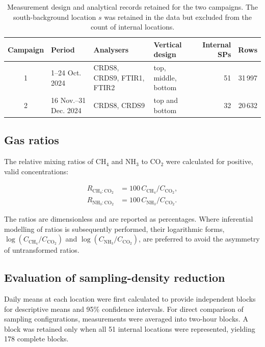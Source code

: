 \documentclass[12pt,a4paper]{article}
\begin{document}
\begin{table}[htbp]
\centering
\caption{Measurement design and analytical records retained for the two
campaigns. The south-background location \(s\) was retained in the data but
excluded from the count of internal locations.}
\label{tab:campaigns}
\begingroup
\small
\setlength{\tabcolsep}{2.2pt}
\begin{tabular}{@{}c l
  >{\raggedright\arraybackslash}p{4.0cm}
  >{\raggedright\arraybackslash}p{2.7cm}
  r r@{}}
\toprule
Campaign & Period & Analysers & Vertical design & Internal SPs & Rows\\
\midrule
1 & 1--24 Oct. 2024 & CRDS8, CRDS9, FTIR1, FTIR2 &
top, middle, bottom & 51 & 31\,997\\
2 & 16 Nov.--31 Dec. 2024 & CRDS8, CRDS9 &
top and bottom & 32 & 20\,632\\
\bottomrule
\end{tabular}
\endgroup
\end{table}

\subsection{Gas ratios}

The relative mixing ratios of \(\mathrm{CH_4}\) and \(\mathrm{NH_3}\) to
\(\mathrm{CO_2}\) were calculated for positive, valid concentrations:

\begin{align}
R_{\mathrm{CH_4:CO_2}} &=
100\,C_{\mathrm{CH_4}}/C_{\mathrm{CO_2}},\\
R_{\mathrm{NH_3:CO_2}} &=
100\,C_{\mathrm{NH_3}}/C_{\mathrm{CO_2}}.
\end{align}

The ratios are dimensionless and are reported as percentages. Where
inferential modelling of ratios is subsequently performed, their logarithmic
forms, \(\log(C_{\mathrm{CH_4}}/C_{\mathrm{CO_2}})\) and
\(\log(C_{\mathrm{NH_3}}/C_{\mathrm{CO_2}})\), are preferred to avoid the
asymmetry of untransformed ratios.

\subsection{Evaluation of sampling-density reduction}

Daily means at each location were first calculated to provide independent
blocks for descriptive means and 95\% confidence intervals. For direct
comparison of sampling configurations, measurements were averaged into
two-hour blocks. A block was retained only when all 51 internal locations
were represented, yielding 178 complete blocks.
\end{document}
